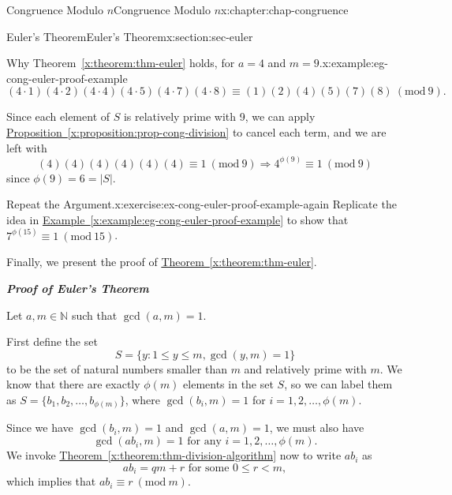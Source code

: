 \documentclass[oneside,10pt,]{book}
\newcommand{\xreffont}{\relax}
\newcommand{\alert}[1]{\textbf{\textit{#1}}}
\numberwithin{equation}{section}
\newcommand{\Mod}[1]{\ \left(\mathrm{mod}\ #1\right)}
\newcommand{\lt}{<}
\begin{document}
\begin{chapterptx}{Congruence Modulo \(n\)}{}{Congruence Modulo \(n\)}{}{}{x:chapter:chap-congruence}
\begin{sectionptx}{Euler's Theorem}{}{Euler's Theorem}{}{}{x:section:sec-euler}
\begin{example}{Why Theorem~{\xreffont\ref*{x:theorem:thm-euler}} holds, for \(a = 4\) and \(m = 9\).}{x:example:eg-cong-euler-proof-example}
\begin{equation*}
(4\cdot 1)(4\cdot 2)(4\cdot 4)(4 \cdot 5)(4\cdot 7)(4\cdot 8) \equiv (1)(2)(4)(5)(7)(8)\Mod{9}\text{.}
\end{equation*}
%
\par
Since each element of \(S\) is relatively prime with 9, we can apply \hyperref[x:proposition:prop-cong-division]{Proposition~{\xreffont\ref{x:proposition:prop-cong-division}}} to cancel each term, and we are left with%
\begin{equation*}
(4)(4)(4)(4)(4)(4) \equiv 1 \Mod{9} \Rightarrow 4^{\phi(9)} \equiv 1 \Mod{9}
\end{equation*}
since \(\phi(9) = 6 = |S|\).%
\end{example}
\begin{inlineexercise}{Repeat the Argument.}{x:exercise:ex-cong-euler-proof-example-again}%
Replicate the idea in \hyperref[x:example:eg-cong-euler-proof-example]{Example~{\xreffont\ref{x:example:eg-cong-euler-proof-example}}} to show that \(7^{\phi(15)} \equiv 1 \Mod{15}\).%
\end{inlineexercise}%
Finally, we present the proof of \hyperref[x:theorem:thm-euler]{Theorem~{\xreffont\ref{x:theorem:thm-euler}}}.%
\par
\alert{Proof of Euler's Theorem}%
\par
Let \(a,m \in \mathbb{N}\) such that \(\gcd(a,m) = 1\).%
\par
First define the set%
\begin{equation*}
S = \{y : 1 \leq y \leq m, \gcd(y,m) = 1\}
\end{equation*}
to be the set of natural numbers smaller than \(m\) and relatively prime with \(m\). We know that there are exactly \(\phi(m)\) elements in the set \(S\), so we can label them as \(S = \{b_1,b_2,\ldots,b_{\phi(m)}\}\), where \(\gcd(b_i,m) = 1\) for \(i = 1,2,\ldots,\phi(m)\).%
\par
Since we have \(\gcd(b_i,m) = 1\) and \(\gcd(a,m) = 1\), we must also have%
\begin{equation*}
\gcd(ab_i, m) = 1 \text{ for any } i = 1,2,\ldots,\phi(m)\text{.}
\end{equation*}
We invoke \hyperref[x:theorem:thm-division-algorithm]{Theorem~{\xreffont\ref{x:theorem:thm-division-algorithm}}} now to write \(ab_i\) as%
\begin{equation*}
ab_i = qm + r \text{ for some } 0 \leq r \lt m,
\end{equation*}
which implies that \(ab_i \equiv r \Mod{m}\).%
\par

\end{sectionptx}
\end{chapterptx}
\end{document}
